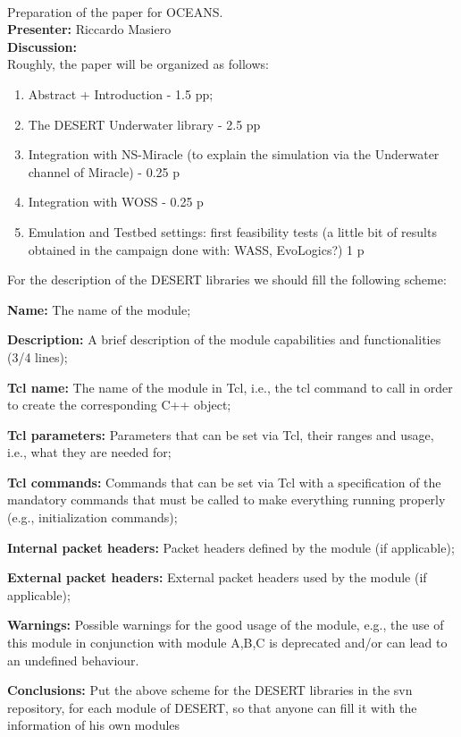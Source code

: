 \documentclass[11pt,journal,draftclsnofoot,onecolumn,twoside,letterpaper]{IEEEtran}
\theoremstyle{definition} \newtheorem{definition}[]{Definition}
\theoremstyle{theorem} \newtheorem{theorem}[]{Theorem}
\begin{document}
\  \\
 Preparation of the paper for OCEANS.\\
{\bf Presenter:} Riccardo Masiero\\
{\bf Discussion:} \\
Roughly, the paper will be organized as follows:
\begin{enumerate}
 \item Abstract + Introduction - 1.5 pp;
 \item The DESERT Underwater library - 2.5 pp
 \item Integration with NS-Miracle (to explain the simulation via the Underwater channel of Miracle) - 0.25 p
 \item Integration with WOSS - 0.25 p
 \item Emulation and Testbed settings: first feasibility tests (a little bit of results obtained in the campaign done with: WASS, EvoLogics?) 1 p 
\end{enumerate}
For the description of the DESERT libraries we should fill the following scheme:
\begin{description}
 \item {\bf Name:} The name of the module;
 \item {\bf Description:} A brief description of the module capabilities and functionalities (3/4 lines);
\item {\bf Tcl name:} The name of the module in Tcl, i.e., the tcl command to call in order to create the corresponding C++ object;
\item {\bf Tcl parameters:} Parameters that can be set via Tcl, their ranges and usage, i.e., what they are needed for;
\item {\bf Tcl commands:} Commands that can be set via Tcl with a specification of the mandatory commands that must be called to make everything running properly (e.g., initialization commands);
\item {\bf Internal packet headers:} Packet headers defined by the module (if applicable);
\item {\bf External packet headers:} External packet headers used by the module (if applicable);
\item {\bf Warnings:} Possible warnings for the good usage of the module, e.g., the use of this module in conjunction with module A,B,C is deprecated and/or can lead to an undefined behaviour.
\end{description}


{\bf Conclusions:} Put the above scheme for the DESERT libraries in the svn repository, for each module of DESERT, so that anyone can fill it with the information of his own modules\\ 
\end{document}
